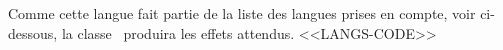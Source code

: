 Comme cette langue fait partie de la liste des langues prises en compte, voir ci-dessous, la classe \thisproj\ produira les effets attendus.
<<LANGS-CODE>>
